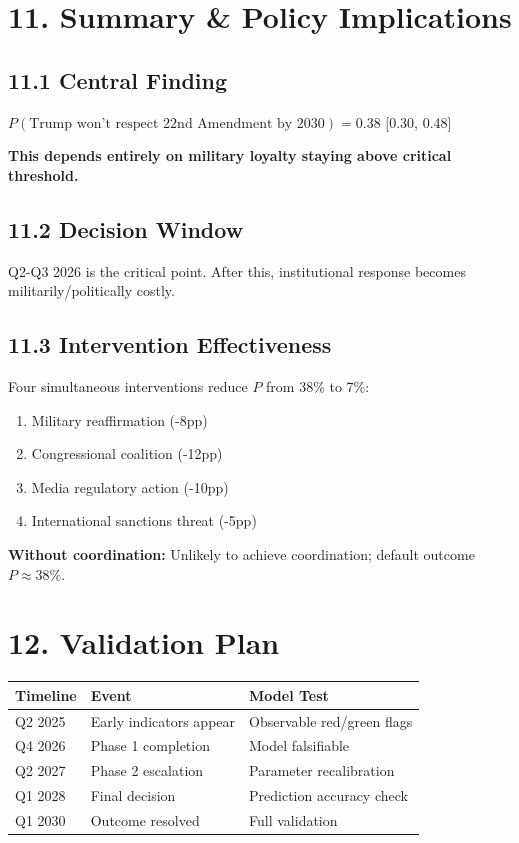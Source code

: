 \section{11. Summary \& Policy Implications}

\subsection{11.1 Central Finding}

\begin{fancybox}
\large
$P(\text{Trump won't respect 22nd Amendment by 2030}) = 0.38$ [0.30, 0.48]

\textbf{This depends entirely on military loyalty staying above critical threshold.}
\end{fancybox}

\subsection{11.2 Decision Window}

Q2-Q3 2026 is the critical point. After this, institutional response becomes militarily/politically costly.

\subsection{11.3 Intervention Effectiveness}

Four simultaneous interventions reduce $P$ from 38\% to 7\%:
\begin{enumerate}
\item Military reaffirmation (-8pp)
\item Congressional coalition (-12pp)
\item Media regulatory action (-10pp)
\item International sanctions threat (-5pp)
\end{enumerate}

\textbf{Without coordination:} Unlikely to achieve coordination; default outcome $P \approx 38\%$.

\section{12. Validation Plan}

\begin{table}[h]
\centering
\begin{tabular}{|l|l|l|}
\hline
\textbf{Timeline} & \textbf{Event} & \textbf{Model Test} \\
\hline
Q2 2025 & Early indicators appear & Observable red/green flags \\
Q4 2026 & Phase 1 completion & Model falsifiable \\
Q2 2027 & Phase 2 escalation & Parameter recalibration \\
Q1 2028 & Final decision & Prediction accuracy check \\
Q1 2030 & Outcome resolved & Full validation \\
\hline
\end{tabular}
\end{table}

